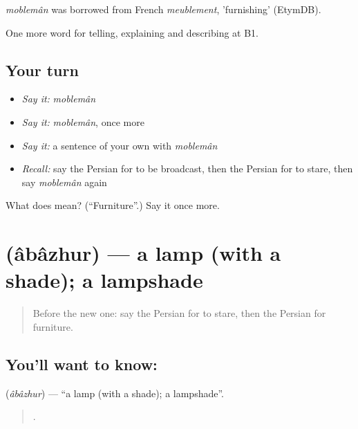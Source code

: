 \begin{cousinweb}
\emph{moblemân} was borrowed from French \emph{meublement}, 'furnishing' (EtymDB).
\end{cousinweb}

\begin{grammarlens}[title={What you've built}]
One more word for telling, explaining and describing at B1.
\end{grammarlens}

\subsection*{Your turn}
\begin{itemize}
\raggedright
  \item \emph{Say it:} \emph{moblemân}
  \item \emph{Say it:} \emph{moblemân}, once more
  \item \emph{Say it:} a sentence of your own with \emph{moblemân}
  \item \emph{Recall:} say the Persian for to be broadcast, then the Persian for to stare, then say \emph{moblemân} again
\end{itemize}

\begin{tcolorbox}[breakable,colback=teal!4,colframe=teal!35!black,title={Before you move on}]
What does  mean? (\textquotedblleft{}Furniture\textquotedblright{}.) Say it once more.
\end{tcolorbox}
\section[\texorpdfstring{\fa{آباژور} (âbâzhur)}{آباژور (âbâzhur)}]{ (âbâzhur) — a lamp (with a shade); a lampshade}

\label{lesson:FA-C534-abazhur}



\begin{quote}
Before the new one: say the Persian for to stare, then the Persian for furniture.
\end{quote}

\subsection*{You'll want to know: }
\textbf{} (\emph{âbâzhur}) — \textquotedblleft{}a lamp (with a shade); a lampshade\textquotedblright{}.

\begin{quote}
     .
\end{quote}

